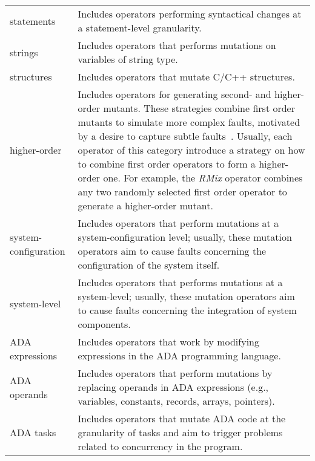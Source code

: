 \begin{table}
\begin{tabular}{p{1.8cm}|p{5.4cm}}
statements & Includes operators performing syntactical changes at a statement-level granularity.\\
strings & Includes operators that performs mutations on variables of string type.\\
structures & Includes operators that mutate C/C++ structures.\\
higher-order & Includes operators for generating second- and higher-order mutants. These strategies combine first order mutants to simulate more complex faults, motivated by a desire to capture subtle faults~\cite{jia2009higher}. Usually, each operator of this category introduce a strategy on how to combine first order operators to form a higher-order one. For example, the \emph{RMix} operator combines any two randomly selected first order operator to generate a higher-order mutant. \\
system-configuration & Includes operators that perform mutations at a system-configuration level; usually, these mutation operators aim to cause faults concerning the configuration of the system itself.\\
system-level & Includes operators that performs mutations at a system-level; usually, these mutation operators aim to cause faults concerning the integration of system components. \\
ADA expressions & Includes operators that work by modifying expressions in the ADA programming language. \\
ADA operands & Includes operators that perform mutations by replacing operands in ADA expressions (e.g., variables, constants, records, arrays, pointers).\\
ADA tasks & Includes operators that mutate ADA code at the granularity of tasks and aim to trigger problems related to concurrency in the program.\\
\bottomrule
\end{tabular}
\end{table}